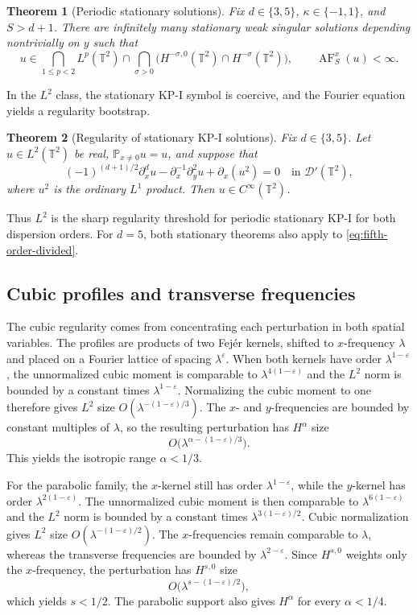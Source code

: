 \documentclass[12pt,reqno,letterpaper]{amsart}
\numberwithin{equation}{section}
\newtheorem{theorem}{Theorem}[section]
\theoremstyle{definition}
\newcommand{\T}{\mathbb T}
\newcommand{\eps}{\varepsilon}
\newcommand{\la}{\lambda}
\begin{document}
\begin{theorem}[Periodic stationary solutions]
\label{thm:stationary-flexibility}
Fix $d\in\{3,5\}$, $\kappa\in\{-1,1\}$, and $S>d+1$.  There are
infinitely many stationary weak singular solutions depending nontrivially
on $y$ such that
\[
 u\in\bigcap_{1\leq p<2}L^p(\T^2)
    \cap\bigcap_{\sigma>0}
       \bigl(H^{-\sigma,0}(\T^2)\cap H^{-\sigma}(\T^2)\bigr),
 \qquad
 \operatorname{AF}_S^x(u)<\infty.
\]
\end{theorem}

In the $L^2$ class, the stationary KP-I symbol is coercive, and the Fourier
equation yields a regularity bootstrap.

\begin{theorem}[Regularity of stationary KP-I solutions]
\label{thm:stationary-rigidity}
Fix $d\in\{3,5\}$.  Let $u\in L^2(\T^2)$ be real,
$\mathbb P_{x\neq0}u=u$, and suppose that
\[
 (-1)^{(d+1)/2}\partial_x^du
 -\partial_x^{-1}\partial_y^2u+\partial_x(u^2)=0
 \quad\text{in }\mathcal D'(\T^2),
\]
where $u^2$ is the ordinary $L^1$ product.  Then
$u\in C^\infty(\T^2)$.
\end{theorem}

Thus $L^2$ is the sharp regularity threshold for periodic stationary KP-I
for both dispersion orders.
For $d=5$, both stationary theorems also apply to
\eqref{eq:fifth-order-divided}.

\subsection{Cubic profiles and transverse frequencies}

The cubic regularity comes from concentrating each perturbation
in both spatial variables.  The profiles are products of two Fej\'er
kernels, shifted to $x$-frequency $\la$ and placed on a Fourier
lattice of spacing $\la^\eps$.  When both kernels have order
$\la^{1-\eps}$, the unnormalized cubic moment is comparable to
$\la^{4(1-\eps)}$ and the $L^2$ norm is bounded by a constant times
$\la^{1-\eps}$.  Normalizing the cubic moment to one therefore gives
$L^2$ size $O(\la^{-(1-\eps)/3})$.  The $x$- and $y$-frequencies are
bounded by constant multiples of $\la$, so the
resulting perturbation has $H^\alpha$ size
\[
 O\bigl(\la^{\alpha-(1-\eps)/3}\bigr).
\]
This yields the isotropic range $\alpha<1/3$.

For the parabolic family, the $x$-kernel still has order
$\la^{1-\eps}$, while the $y$-kernel has order
$\la^{2(1-\eps)}$.  The unnormalized cubic moment is then comparable to
$\la^{6(1-\eps)}$ and the $L^2$ norm is bounded by a constant times
$\la^{3(1-\eps)/2}$.  Cubic normalization gives $L^2$ size
$O(\la^{-(1-\eps)/2})$.  The $x$-frequencies remain comparable
to $\la$, whereas the transverse frequencies are bounded by
$\la^{2-\eps}$.  Since $H^{s,0}$ weights only the $x$-frequency,
the perturbation has $H^{s,0}$ size
\[
 O\bigl(\la^{s-(1-\eps)/2}\bigr),
\]
which yields $s<1/2$.
The parabolic support also gives $H^\alpha$ for every $\alpha<1/4$.
\end{document}

